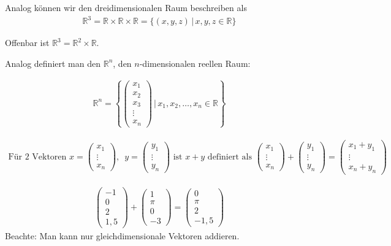 Analog können wir den dreidimensionalen Raum beschreiben als
\begin{align*}
	\mathbb{R}^3 = \mathbb{R} \times \mathbb{R} \times \mathbb{R} = \{(x,y,z)\,|\,x,y,z \in \mathbb{R}\}
\end{align*}

Offenbar ist $\mathbb{R}^3 = \mathbb{R}^2 \times \mathbb{R}$.

Analog definiert man den $\mathbb{R}^n$, den $n$-dimensionalen reellen Raum:

\begin{align*}
	\mathbb{R}^n = \left\{\begin{pmatrix}x_1 \\ x_2 \\ x_3 \\ \vdots \\ x_n \end{pmatrix}\,\Bigg|\, x_1, x_2, \dots, x_n \in \mathbb{R} \right\}
\end{align*}

\begin{align*}
	\text{Für 2 Vektoren }x = \begin{pmatrix}x_1 \\ \vdots \\ x_n \end{pmatrix},\enspace y = \begin{pmatrix}y_1 \\ \vdots \\ y_n \end{pmatrix}\text{ ist } x + y\text{ definiert als }\begin{pmatrix}x_1 \\ \vdots \\ x_n \end{pmatrix} + \begin{pmatrix}y_1 \\ \vdots \\ y_n \end{pmatrix} = \begin{pmatrix}x_1 + y_1 \\ \vdots \\ x_n + y_n \end{pmatrix}
\end{align*}

\begin{align*}
	\begin{pmatrix} -1 \\ 0 \\ 2 \\ 1,5 \end{pmatrix} + \begin{pmatrix} 1 \\ \pi \\ 0 \\ -3 \end{pmatrix} = \begin{pmatrix} 0 \\ \pi \\ 2 \\ -1,5 \end{pmatrix}
\end{align*}
Beachte: Man kann nur gleichdimensionale Vektoren addieren.

